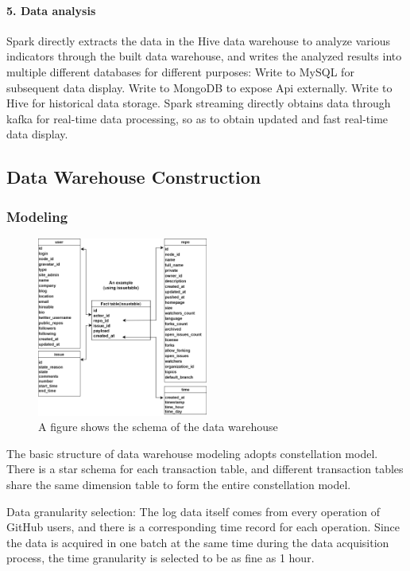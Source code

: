 \paragraph*{5. Data analysis}
Spark directly extracts the data in the Hive data warehouse to analyze various indicators through the built data warehouse, and writes the analyzed results into multiple different databases for different purposes:
Write to MySQL for subsequent data display.
Write to MongoDB to expose Api externally.
Write to Hive for historical data storage.
Spark streaming directly obtains data through kafka for real-time data processing, so as to obtain updated and fast real-time data display.




\subsection{Data Warehouse Construction}



\subsubsection{Modeling}


\begin{figure}[H]
    \centering
    \includegraphics[width=0.5\textwidth]{./pic/tables.png}
    \caption{A figure shows the schema of the data warehouse}
    \label{fig:tables}
\end{figure}



The basic structure of data warehouse modeling adopts constellation model. There is a star schema for each transaction table, and different transaction tables share the same dimension table to form the entire constellation model.

Data granularity selection: The log data itself comes from every operation of GitHub users, and there is a corresponding time record for each operation. Since the data is acquired in one batch at the same time during the data acquisition process, the time granularity is selected to be as fine as 1 hour.

